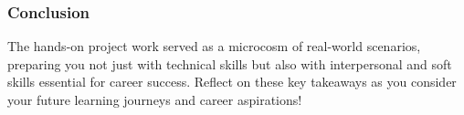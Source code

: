 \documentclass{beamer}
\begin{document}
\begin{frame}[fragile]
    \frametitle{Conclusion}
    The hands-on project work served as a microcosm of real-world scenarios, preparing you not just with technical skills but also with interpersonal and soft skills essential for career success. Reflect on these key takeaways as you consider your future learning journeys and career aspirations!
\end{frame}
\end{document}
